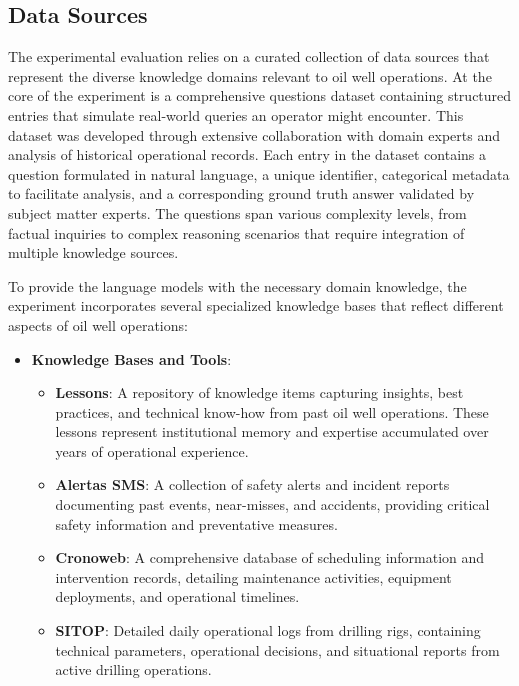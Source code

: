         \subsection{Data Sources}

                The experimental evaluation relies on a  curated collection of data sources that represent the diverse knowledge domains relevant to oil well operations. 
                At the core of the experiment is a comprehensive questions dataset containing structured entries that simulate real-world queries an operator might encounter. 
                This dataset was developed through extensive collaboration with domain experts and analysis of historical operational records.
                Each entry in the dataset contains a question formulated in natural language, a unique identifier, categorical metadata to facilitate analysis, and a corresponding ground truth answer validated by subject matter experts. The questions span various complexity levels, from factual inquiries to complex reasoning scenarios that require integration of multiple knowledge sources.

            To provide the language models with the necessary domain knowledge, the experiment incorporates several specialized knowledge bases that reflect different aspects of oil well operations:

            \begin{itemize}
                \item \textbf{Knowledge Bases and Tools}:
                \begin{itemize}
                    \item \textbf{Lessons}: A repository of knowledge items capturing insights, best practices, and technical know-how from past oil well operations. These lessons represent institutional memory and expertise accumulated over years of operational experience.
                    \item \textbf{Alertas SMS}: A collection of safety alerts and incident reports documenting past events, near-misses, and accidents, providing critical safety information and preventative measures.
                    \item \textbf{Cronoweb}: A comprehensive database of scheduling information and intervention records, detailing maintenance activities, equipment deployments, and operational timelines.
                    \item \textbf{SITOP}: Detailed daily operational logs from drilling rigs, containing technical parameters, operational decisions, and situational reports from active drilling operations.
                \end{itemize}
            \end{itemize}

